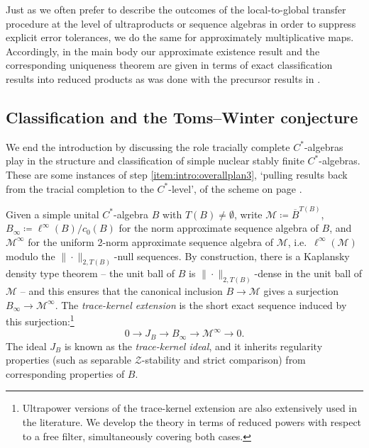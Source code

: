\documentclass[a4paper,11pt]{amsart}
\theoremstyle{definition}
\numberwithin{equation}{section}
\numberwithin{theorem}{section}
\newcommand{\Z}{\mathcal Z}
\newcommand{\M}{\mathcal{M}}
\newcommand{\completion}[2]{\overline{#1}^{#2}}
\begin{document}
Just as we often prefer to describe the outcomes of the local-to-global transfer procedure at the level of ultraproducts or sequence algebras in order to suppress explicit error tolerances, we do the same for approximately multiplicative maps. Accordingly, in the main body our approximate existence result and the corresponding uniqueness theorem are given in terms of exact classification results into reduced products as was done with the precursor results in \cite{CETW-classification}.

\subsection{Classification and the Toms--Winter conjecture}\label{intro:applications}

We end the introduction by discussing the role tracially complete $C^*$-algebras play in the structure and classification of simple nuclear stably finite $C^*$-algebras. These are some instances of step \ref{item:intro:overallplan3}, `pulling results back from the tracial completion to the $C^*$-level', of the scheme on page \pageref{item:intro:overallplan3}.

Given a simple unital $C^*$-algebra $B$ with $T(B)\neq\emptyset$, write $\mathcal M\coloneqq \completion{B}{T(B)}$, $B_\infty \coloneqq \ell^\infty(B) / c_0(B)$ for the norm approximate sequence algebra of $B$, and $\mathcal M^\infty$ for the uniform 2-norm approximate sequence algebra of $\M$, i.e.\ $\ell^\infty(\M)$ modulo the $\|\cdot\|_{2,T(B)}$-null sequences. By construction, there is a Kaplansky density type theorem -- the unit ball of $B$ is $\|\cdot\|_{2,T(B)}$-dense in the unit ball of $\M$ -- and this ensures that the canonical inclusion $B\to \mathcal M$ gives a surjection $B_\infty\to\mathcal M^\infty$.  The \emph{trace-kernel extension} is the short exact sequence induced by this surjection:\footnote{Ultrapower versions of the trace-kernel extension are also extensively used in the literature. We develop the theory in terms of reduced powers with respect to a free filter, simultaneously covering both cases.}
\begin{equation}
    0\longrightarrow J_B\longrightarrow B_\infty\longrightarrow \M^\infty\longrightarrow 0.
\end{equation}
The ideal $J_B$ is known as the \emph{trace-kernel ideal}, and it inherits regularity properties (such as separable $\Z$-stability and strict comparison) from corresponding properties of $B$.  
\end{document}
